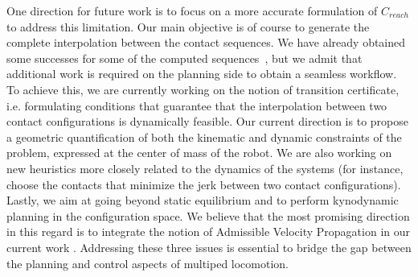 One direction for future work is to focus on a more accurate formulation of $C_{reach}$ to address 
this limitation.
Our main objective is of course to generate the complete interpolation between the contact sequences.
We have already obtained some successes for some of the computed sequences~\citep{Carpentier2016}, but we admit that additional
work is required on the planning side to obtain a seamless workflow. To achieve this, we are currently working on the notion of transition certificate, i.e. formulating
conditions that guarantee that the interpolation between two contact configurations is dynamically feasible.
Our current direction is to propose a geometric quantification of both the kinematic and dynamic constraints of the problem, expressed
at the center of mass of the robot.
 We are also
working on new heuristics more closely related to the dynamics of the systems (for instance, choose the contacts that minimize the jerk between two contact configurations).
Lastly, we aim at going beyond static equilibrium and to perform kynodynamic planning in the configuration space. We believe that the most promising direction in this regard is to integrate
the notion of Admissible Velocity Propagation in our current work \citep{DBLP:conf/rss/PhamCN13}.
Addressing these three issues is essential to bridge the gap between the planning and control aspects of multiped locomotion.
